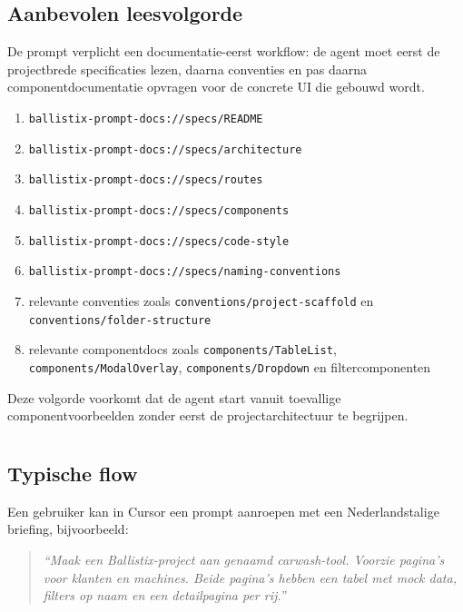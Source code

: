 \subsection{Aanbevolen leesvolgorde}

De prompt verplicht een documentatie-eerst workflow: de agent moet eerst de projectbrede specificaties lezen, daarna conventies en pas daarna componentdocumentatie opvragen voor de concrete UI die gebouwd wordt.

\begin{enumerate}
  \item \texttt{ballistix-prompt-docs://specs/README}
  \item \texttt{ballistix-prompt-docs://specs/architecture}
  \item \texttt{ballistix-prompt-docs://specs/routes}
  \item \texttt{ballistix-prompt-docs://specs/components}
  \item \texttt{ballistix-prompt-docs://specs/code-style}
  \item \texttt{ballistix-prompt-docs://specs/naming-conventions}
  \item relevante conventies zoals \texttt{conventions/project-scaffold} en \texttt{conventions/folder-structure}
  \item relevante componentdocs zoals \texttt{components/TableList}, \texttt{components/ModalOverlay}, \texttt{components/Dropdown} en filtercomponenten
\end{enumerate}

Deze volgorde voorkomt dat de agent start vanuit toevallige componentvoorbeelden zonder eerst de projectarchitectuur te begrijpen.

\section{}
\label{sec:poc-agentic-workflow}

\subsection{Typische flow}

Een gebruiker kan in Cursor een prompt aanroepen met een Nederlandstalige briefing, bijvoorbeeld:

\begin{quote}
\textit{``Maak een Ballistix-project aan genaamd carwash-tool. Voorzie pagina's voor klanten en machines. Beide pagina's hebben een tabel met mock data, filters op naam en een detailpagina per rij.''}
\end{quote}

